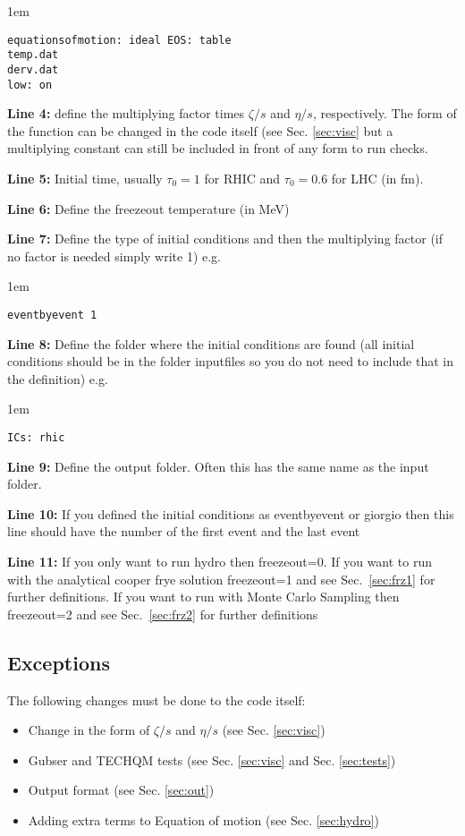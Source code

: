 \documentclass[article]{revtex4-1}
\newcommand{\code}[1]{\bigskip\noindent\begin{addmargin}[3em]{1em}\begin{linenumbers}\texttt{#1}\end{linenumbers}\end{addmargin}\bigskip}
\begin{document}
\code{equationsofmotion: ideal EOS: table\\
temp.dat\\
derv.dat\\
low: on}  

{\bf Line 4:} define the multiplying factor times $\zeta/s$ and $\eta/s$, respectively.  The form of the function can be changed in the code itself (see Sec. \ref{sec:visc} but a multiplying constant can still be included in front of any form to run checks.

{\bf Line 5:} Initial time, usually $\tau_0=1$ for RHIC and $\tau_0=0.6$ for LHC (in fm). 

{\bf Line 6:} Define the freezeout temperature (in MeV)

{\bf Line 7:} Define the type of initial conditions and then the multiplying factor (if no factor is needed simply write 1) e.g. 

\code{eventbyevent 1}

{\bf Line 8:} Define the folder where the initial conditions are found (all initial conditions should be in the folder inputfiles so you do not need to include that in the definition) e.g.

\code{ICs: rhic}

{\bf Line 9:} Define the output folder. Often this has the same name as the input folder.

{\bf Line 10:} If you defined the initial conditions as eventbyevent or giorgio then this line should have the number of the first event and the last event

{\bf Line 11:} If you only want to run hydro then freezeout=0.  If you want to run with the analytical cooper frye solution freezeout=1 and see Sec.\ \ref{sec:frz1} for further definitions.  If you want to run with Monte Carlo Sampling then freezeout=2 and see Sec.\ \ref{sec:frz2} for further definitions

\subsection{Exceptions}

The following changes must be done to the code itself:

\begin{itemize}
\item Change in the form of $\zeta/s$ and $\eta/s$ (see Sec. \ref{sec:visc})
\item Gubser and TECHQM tests (see Sec. \ref{sec:visc} and Sec. \ref{sec:tests})
\item Output format (see Sec. \ref{sec:out})
\item Adding extra terms to Equation of motion (see Sec. \ref{sec:hydro})
\end{itemize}
\end{document}
